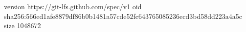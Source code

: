 version https://git-lfs.github.com/spec/v1
oid sha256:566ed1afe8879df86b0b1481a57cde52fc643765085236ecd3bd58dd223a4a5c
size 1048672
